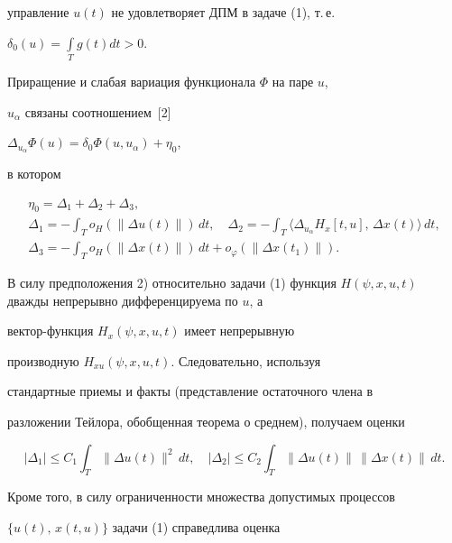управление $u(t)$ не удовлетворяет ДПМ в задаче (1), т.\,е.


$\delta_{0}(u) = \int\limits_{T} g(t) dt > 0$.


Приращение и слабая вариация функционала $\Phi$ на паре $u$,


$u_{\alpha}$ связаны соотношением~[2]


$\Delta_{u_{\alpha}} \Phi(u) = \delta_{0} \Phi(u, u_{\alpha}) + \eta_{0}$,


в котором


\begin{gather*}


\eta_{0} = \Delta_{1} + \Delta_{2} + \Delta_{3},\\


\Delta_{1} = - \int_{T} o_{H}(\| \Delta u(t)\|)\,dt,


\quad \Delta_{2} = - \int_{T} \langle \Delta_{u_{\alpha}}


H_{x}[t, u],\, \Delta x(t)\rangle\,dt,\\


\Delta_{3} = - \int_{T} o_{H}(\| \Delta x(t)\|)\,dt +


o_{\varphi}(\| \Delta x(t_{1})\|).


\end{gather*}


В силу предположения 2) относительно задачи (1) функция $H(\psi,


x, u, t)$ дважды непрерывно дифференцируема по $u$, а


вектор-функция $H_{x}(\psi, x, u, t)$ имеет непрерывную


производную $H_{xu}(\psi, x, u, t).$ Следовательно, используя


стандартные приемы и факты (представление остаточного члена в


разложении Тейлора, обобщенная теорема о среднем), получаем оценки


\begin{equation}


| \Delta_{1}| \leq C_{1} \int_{T} \| \Delta u(t)\|^{2}\,dt,


\quad | \Delta_{2}| \leq C_{2} \int_{T} \| \Delta u(t)\|\,


\| \Delta x(t)\|\,dt.


\end{equation}


Кроме того, в силу ограниченности множества допустимых процессов


$ \{ u(t),\, x(t, u)\}$ задачи (1) справедлива оценка 


